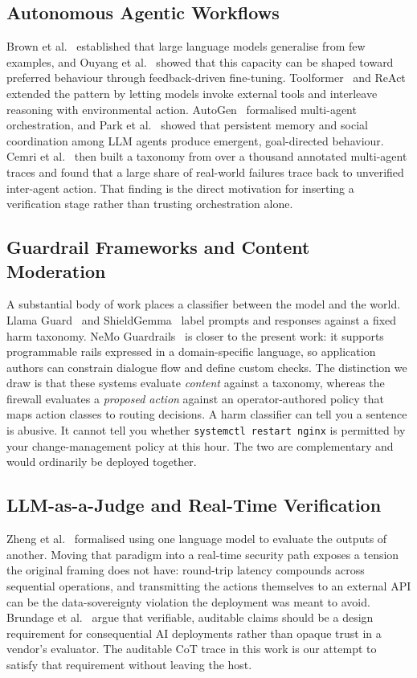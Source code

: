 \documentclass[journal,onecolumn,12pt]{IEEEtran}
\begin{document}
\subsection{Autonomous Agentic Workflows}
Brown et al.~\cite{brown2020} established that large language models generalise from few examples, and Ouyang et al.~\cite{ouyang2022} showed that this capacity can be shaped toward preferred behaviour through feedback-driven fine-tuning. Toolformer~\cite{schick2023} and ReAct~\cite{yao2023} extended the pattern by letting models invoke external tools and interleave reasoning with environmental action. AutoGen~\cite{wu2023} formalised multi-agent orchestration, and Park et al.~\cite{park2023} showed that persistent memory and social coordination among LLM agents produce emergent, goal-directed behaviour. Cemri et al.~\cite{cemri2025} then built a taxonomy from over a thousand annotated multi-agent traces and found that a large share of real-world failures trace back to unverified inter-agent action. That finding is the direct motivation for inserting a verification stage rather than trusting orchestration alone.

\subsection{Guardrail Frameworks and Content Moderation}
A substantial body of work places a classifier between the model and the world. Llama Guard~\cite{inan2023} and ShieldGemma~\cite{zeng2024} label prompts and responses against a fixed harm taxonomy. NeMo Guardrails~\cite{rebedea2023} is closer to the present work: it supports programmable rails expressed in a domain-specific language, so application authors can constrain dialogue flow and define custom checks. The distinction we draw is that these systems evaluate \emph{content} against a taxonomy, whereas the firewall evaluates a \emph{proposed action} against an operator-authored policy that maps action classes to routing decisions. A harm classifier can tell you a sentence is abusive. It cannot tell you whether \texttt{systemctl restart nginx} is permitted by your change-management policy at this hour. The two are complementary and would ordinarily be deployed together.

\subsection{LLM-as-a-Judge and Real-Time Verification}
Zheng et al.~\cite{zheng2023} formalised using one language model to evaluate the outputs of another. Moving that paradigm into a real-time security path exposes a tension the original framing does not have: round-trip latency compounds across sequential operations, and transmitting the actions themselves to an external API can be the data-sovereignty violation the deployment was meant to avoid. Brundage et al.~\cite{brundage2020} argue that verifiable, auditable claims should be a design requirement for consequential AI deployments rather than opaque trust in a vendor's evaluator. The auditable CoT trace in this work is our attempt to satisfy that requirement without leaving the host.
\end{document}
